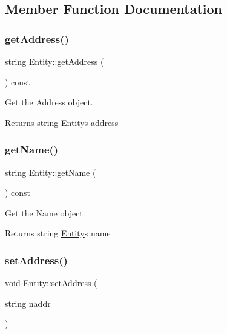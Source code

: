 \subsection{Member Function Documentation}
\mbox{\label{classEntity_a8acaa5f9e84722ea668a0e33789c347e}} 
\subsubsection{\texorpdfstring{get\+Address()}{getAddress()}}
{\footnotesize\ttfamily string Entity\+::get\+Address (\begin{DoxyParamCaption}{ }\end{DoxyParamCaption}) const}



Get the Address object. 

\begin{DoxyReturn}{Returns}
string \hyperlink{classEntity}{Entity}\textquotesingle{}s address 
\end{DoxyReturn}
\mbox{\label{classEntity_a438837d2be5b221fd9aafc323c46f08a}} 
\subsubsection{\texorpdfstring{get\+Name()}{getName()}}
{\footnotesize\ttfamily string Entity\+::get\+Name (\begin{DoxyParamCaption}{ }\end{DoxyParamCaption}) const}



Get the Name object. 

\begin{DoxyReturn}{Returns}
string \hyperlink{classEntity}{Entity}\textquotesingle{}s name 
\end{DoxyReturn}
\mbox{\label{classEntity_ae362658ba037f024aa5edc2cdce2d833}} 
\subsubsection{\texorpdfstring{set\+Address()}{setAddress()}}
{\footnotesize\ttfamily void Entity\+::set\+Address (\begin{DoxyParamCaption}\item[{string}]{naddr }\end{DoxyParamCaption})}



